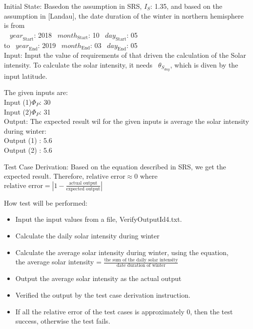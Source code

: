 \documentclass[12pt, titlepage]{article}
\begin{document}
\begin{enumerate}
Initial State:
Basedon the assumption in SRS\cite{YS2019}, $I_{S}$: 1.35, and based on the
assumption in [Landau\cite{Charles2001}], the date duration of the winter in
northern hemisphere is from\\
~ $\mathit{year}_\text{Start}$: 2018
~$\mathit{month}_\text{Start}$: 10 
~$\mathit{day}_\text{Start}$: 05 \\
 to
~$\mathit{year}_\text{End}$: 2019 
~$\mathit{month}_\text{End}$: 03
~$\mathit{day}_\text{End}$: 05\\

 Input: Input the value of requirements of
\progname that driven the calculation of the Solar intensity. To calculate the
solar intensity, it needs ~$\theta_{S_{day}}$, which is diven by the input
latitude. 

The given inputs are:\\ 
Input (1)$\Phi_P$: 30 \\ 
Input (2)$\Phi_P$: 31\\

Output: The expected result wil for the given inputs is average the solar
intensity during winter:\\ 
Output (1) : 5.6\\ 
Output (2) : 5.6\\


Test Case Derivation: Based on the equation described in SRS\cite{YS2019}, we
get the expected result. Therefore, $\text{relative error} \approx 0$ where
$\text{relative error} = | 1 - \frac{\text{actual output}}{ \text{expected
output}} |$


How test will be performed: 

\begin{itemize} 
\item Input the input values from a file, VerifyOutputId4.txt. 
\item Calculate the daily solar intensity during winter 
\item Calculate the average solar intensity during winter, using the equation,\\the average solar intensity = $\frac{\text{the sum of the daily solar
intensity}}{\text{date duration of winter}}$
\item Output the average solar intensity as the actual output
\item Verified the output by the test case derivation instruction. 
\item If all the relative error of the test cases is approximately 0, then the
test success, otherwise the test fails.
\end{itemize}
\end{enumerate}
\end{document}
